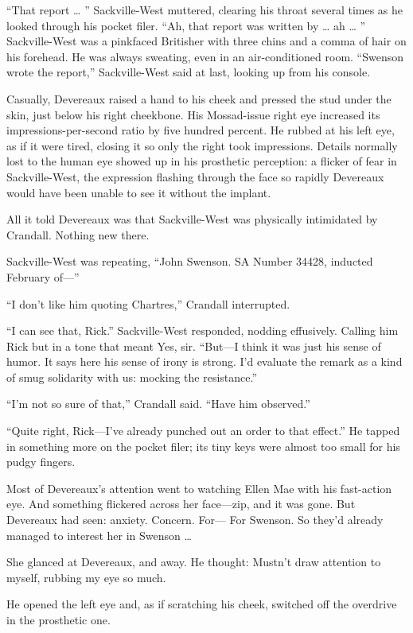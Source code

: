 “That report … ” Sackville-West muttered, clearing his throat several times as he looked through his pocket filer. “Ah, that report was written by … ah … ” Sackville-West was a pinkfaced Britisher with three chins and a comma of hair on his forehead. He was always sweating, even in an air-conditioned room. “Swenson wrote the report,” Sackville-West said at last, looking up from his console.

Casually, Devereaux raised a hand to his cheek and pressed the stud under the skin, just below his right cheekbone. His Mossad-issue right eye increased its impressions-per-second ratio by five hundred percent. He rubbed at his left eye, as if it were tired, closing it so only the right took impressions. Details normally lost to the human eye showed up in his prosthetic perception: a flicker of fear in Sackville-West, the expression flashing through the face so rapidly Devereaux would have been unable to see it without the implant.

All it told Devereaux was that Sackville-West was physically intimidated by Crandall. Nothing new there.

Sackville-West was repeating, “John Swenson. SA Number 34428, inducted February of—”

“I don’t like him quoting Chartres,” Crandall interrupted.

“I can see that, Rick.” Sackville-West responded, nodding effusively. Calling him Rick but in a tone that meant Yes, sir. “But—I think it was just his sense of humor. It says here his sense of irony is strong. I’d evaluate the remark as a kind of smug solidarity with us: mocking the resistance.”

“I’m not so sure of that,” Crandall said. “Have him observed.”

“Quite right, Rick—I’ve already punched out an order to that effect.” He tapped in something more on the pocket filer; its tiny keys were almost too small for his pudgy fingers.

Most of Devereaux’s attention went to watching Ellen Mae with his fast-action eye. And something flickered across her face—zip, and it was gone. But Devereaux had seen: anxiety. Concern. For— For Swenson. So they’d already managed to interest her in Swenson …

She glanced at Devereaux, and away. He thought: Mustn’t draw attention to myself, rubbing my eye so much.

He opened the left eye and, as if scratching his cheek, switched off the overdrive in the prosthetic one.

